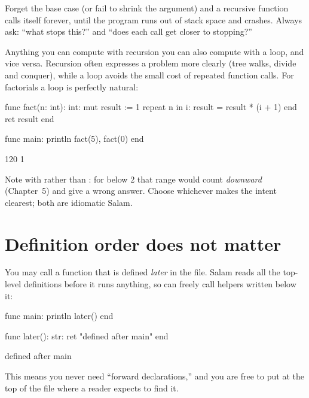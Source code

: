 \begin{warn}
Forget the base case (or fail to shrink the argument) and a recursive
function calls itself forever, until the program runs out of stack space and
crashes. Always ask: ``what stops this?'' and ``does each call get closer to
stopping?''
\end{warn}

\begin{deep}
Anything you can compute with recursion you can also compute with a loop, and
vice versa. Recursion often expresses a problem more clearly (tree walks, divide
and conquer), while a loop avoids the small cost of repeated function calls. For
factorials a loop is perfectly natural:
\begin{salamen}
func fact(n: int): int:
    mut result := 1
    repeat n in i:
        result = result * (i + 1)
    end
    ret result
end

func main:
    println fact(5), fact(0)
end
\end{salamen}
\begin{progout}
120 1
\end{progout}
Note  with  rather than :
for  below 2 that range would count \emph{downward} (Chapter~5) and give
a wrong answer.
Choose whichever makes the intent clearest; both are idiomatic Salam.
\end{deep}

\section{Definition order does not matter}

You may call a function that is defined \emph{later} in the file. Salam reads all
the top-level definitions before it runs anything, so  can freely call
helpers written below it:

\begin{salamen}
func main:
    println later()
end

func later(): str:
    ret "defined after main"
end
\end{salamen}

\begin{progout}
defined after main
\end{progout}

This means you never need ``forward declarations,'' and you are free to put
 at the top of the file where a reader expects to find it.

